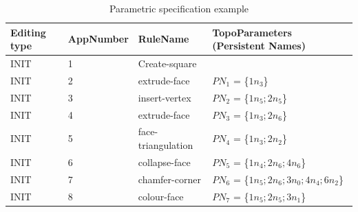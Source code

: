 \begin{table}[ht]
\caption{\label{tbl:param-spec-example}Parametric specification example}
\centering
\begin{tabularx}{\textwidth}{|l|l|l|X|}
\hline
Editing type & AppNumber & RuleName & TopoParameters (Persistent Names)\\[0pt]
\hline
INIT & 1 & Create-square & \\[0pt]
\hline
INIT & 2 & extrude-face & \(PN_{1}\) = \{\(1n_{3}\)\}\\[0pt]
\hline
INIT & 3 & insert-vertex & \(PN_{2}\) = \{\(1n_{5}; 2n_{5}\)\}\\[0pt]
\hline
INIT & 4 & extrude-face & \(PN_{3}\) = \{\(1n_{3}; 2n_{6}\)\}\\[0pt]
\hline
INIT & 5 & face-triangulation & \(PN_{4}\) = \{\(1n_{3}; 2n_{2}\)\}\\[0pt]
\hline
INIT & 6 & collapse-face & \(PN_{5}\) = \{\(1n_{4}; 2n_{6}; 4n_{6}\)\}\\[0pt]
\hline
INIT & 7 & chamfer-corner & \(PN_{6}\) = \{\(1n_{5}; 2n_{6}; 3n_{0}; 4n_{4}; 6n_{2}\)\}\\[0pt]
\hline
INIT & 8 & colour-face & \(PN_{7}\) = \{\(1n_{5}; 2n_{5}; 3n_{1}\)\}\\[0pt]
\hline
\end{tabularx}
\end{table}
